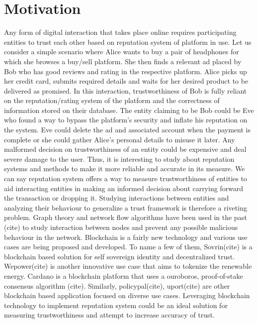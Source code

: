 \section{Motivation}
Any form of digital interaction that takes place online requires participating 
entities to trust each other based on reputation system of platform in use. 
Let us consider a simple scenario where Alice wants to buy a pair of headphones for 
which she browses a buy/sell platform. She then finds a relevant ad placed by Bob 
who has good reviews and rating in the respective platform. Alice picks up her 
credit card, submits required details and waits for her desired product to be  
delivered as promised. In this interaction, trustworthiness of Bob is fully 
reliant on the reputation/rating system of the platform and the correctness of 
information stored on their database. The entity claiming to 
be Bob could be Eve who found a way to bypass the platform's security and inflate 
his reputation on the system. Eve could delete the ad and associated account 
when the payment is complete or she could gather Alice's personal details to 
misuse it later. Any malformed decision on trustworthiness of an entity could be 
expensive and deal severe damage to the user. Thus, it is interesting to study about 
reputation systems and methods to make it more reliable and accurate in its measure.
We can say reputation system offers a way to measure trustworthiness of entities to 
aid interacting entities in making an informed decision about carrying forward 
the transaction or dropping it. 
Studying interactions between entities and analyzing their behaviour to generalize 
a trust framework is therefore a riveting problem. Graph theory and network flow
algorithms have been used in the past (cite) 
to study interaction between nodes and prevent any possible malicious 
behaviour in the network.
Blockchain is a fairly new technology and various use cases are being proposed and developed. 
To name a few of them, Sovrin(cite) is a blockchain based solution for self sovereign
identity and decentralized trust. Wepower(cite) is another innovative use case that 
aims to tokenize the renewable energy. Cardano is a blockchain platform 
that uses a ouroboros, proof-of-stake consensus algorithm (cite). Similarly, 
policypal(cite), uport(cite) are other blockchain based application focused on
diverse use cases. 
Leveraging blockchain technology to implement reputation system could be an ideal 
solution for measuring trustworthiness and attempt to increase accuracy of trust. 


